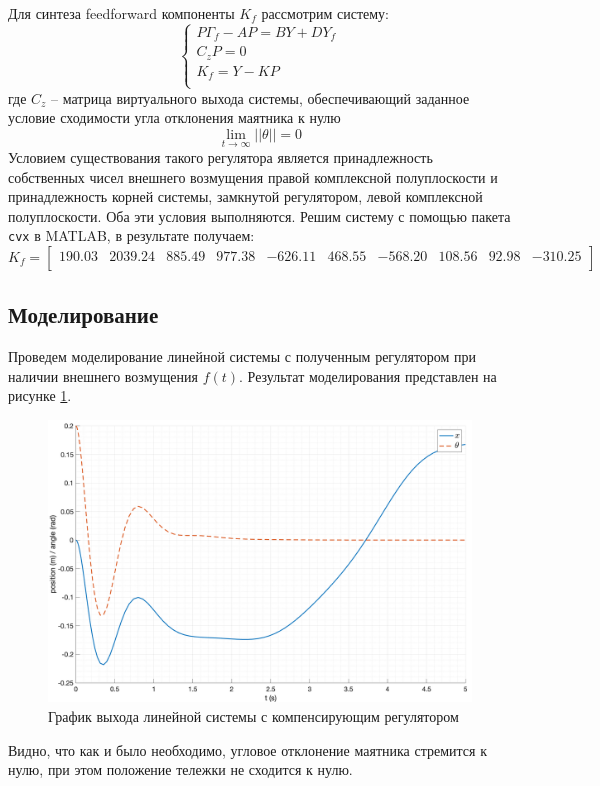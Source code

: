 Для синтеза feedforward компоненты $K_f$ рассмотрим систему:
\begin{equation}
    \begin{cases}
        P\Gamma_f - AP = BY + DY_f \\ 
        C_z P = 0 \\ 
        K_f = Y - K P \\ 
    \end{cases}
\end{equation}
где $C_z$ -- матрица виртуального выхода системы, обеспечивающий заданное условие 
сходимости угла отклонения маятника к нулю
\begin{equation}
    \lim_{t\to\infty} ||\theta|| = 0
\end{equation}
Условием существования такого регулятора является принадлежность собственных чисел 
внешнего возмущения правой комплексной полуплоскости и принадлежность корней 
системы, замкнутой регулятором, левой комплексной полуплоскости. Оба эти условия выполняются. 
Решим систему с помощью пакета \texttt{cvx} в MATLAB, в результате получаем:
\begin{equation}
    K_f = \begin{bmatrix}
190.03  & 2039.24  & 885.49  & 977.38  & -626.11  & 468.55  & -568.20  & 108.56  & 92.98  & -310.25 \\
    \end{bmatrix}
\end{equation}

\subsection{Моделирование}
Проведем моделирование линейной системы с полученным регулятором при наличии внешнего возмущения $f(t)$. 
Результат моделирования представлен на рисунке \ref{fig:compensation_lin}.
\begin{figure}[ht!]
    \centering
    \includegraphics[width=\textwidth]{media/plots/compensation/linear_out_1.png}
    \caption{График выхода линейной системы с компенсирующим регулятором}
    \label{fig:compensation_lin}
\end{figure}
Видно, что как и было необходимо, угловое отклонение маятника стремится к нулю, при этом 
положение тележки не сходится к нулю. 

